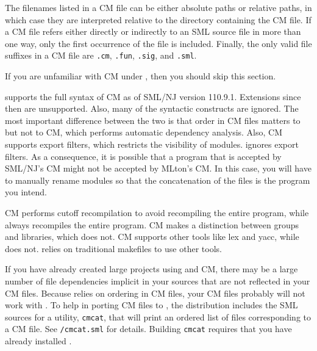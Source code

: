 The filenames listed in a CM file can be either absolute paths or relative
paths, in which case they are interpreted relative to the directory containing
the CM file.  If a CM file refers either directly or indirectly to an SML source
file in more than one way, only the first occurrence of the file is included.
Finally, the only valid file suffixes in a CM file are {\tt .cm}, {\tt .fun},
{\tt .sig}, and {\tt .sml}.


If you are unfamiliar with CM under {\smlnj}, then you should skip this
section.

{\mlton} supports the full syntax of CM as of SML/NJ version 110.9.1.
Extensions since then are unsupported.  Also, many of the syntactic
constructs are ignored.  The most important difference between the two is that
order in CM files matters to {\mlton} but not to CM, which performs automatic
dependency analysis.  Also, CM supports export filters, which restricts the
visibility of modules.  {\mlton} ignores export filters.  As a consequence, it
is possible that a program that is accepted by SML/NJ's CM might not be accepted
by MLton's CM.  In this case, you will have to manually rename modules so that
the concatenation of the files is the program you intend.

CM performs cutoff recompilation to avoid recompiling the entire program, while
{\mlton} always recompiles the entire program.  CM makes a distinction between
groups and libraries, which {\mlton} does not.  CM supports other tools like lex
and yacc, while {\mlton} does not.  {\mlton} relies on traditional makefiles to
use other tools.


If you have already created large projects using {\smlnj} and CM, there may be a
large number of file dependencies implicit in your sources that are not
reflected in your CM files.  Because {\mlton} relies on ordering in CM files,
your CM files probably will not work with {\mlton}.  To help in porting CM files
to {\mlton}, the {\mlton} distribution includes the SML sources for a
utility, {\tt cmcat}, that will print an ordered list of files corresponding to
a CM file.  See {\tt \doc/cmcat.sml} for details.  Building {\tt cmcat}
requires that you have already installed {\smlnj}.

